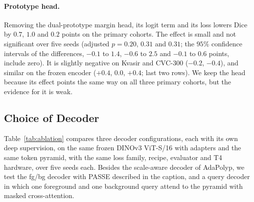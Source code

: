 \documentclass{ieeeaccess}
\begin{document}
\paragraph{Prototype head.} Removing the dual-prototype margin head, its logit term and its loss lowers Dice by $0.7$, $1.0$ and $0.2$ points on the primary cohorts. The effect is small and not significant over five seeds (adjusted $p=0.20$, $0.31$ and $0.31$; the $95\%$ confidence intervals of the differences, $-0.1$ to $1.4$, $-0.6$ to $2.5$ and $-0.1$ to $0.6$ points, include zero). It is slightly negative on Kvasir and CVC-300 ($-0.2$, $-0.4$), and similar on the frozen encoder ($+0.4$, $0.0$, $+0.4$; last two rows). We keep the head because its effect points the same way on all three primary cohorts, but the evidence for it is weak.

\subsection{Choice of Decoder}
\label{sec:ablation}
Table~\ref{tab:ablation} compares three decoder configurations, each with its own deep supervision, on the same frozen DINOv3 ViT-S/16 with adapters and the same token pyramid, with the same loss family, recipe, evaluator and T4 hardware, over five seeds each. Besides the scale-aware decoder of AdaPolyp, we test the fg/bg decoder with PASSE described in the caption, and a query decoder in which one foreground and one background query attend to the pyramid with masked cross-attention.

\begin{table}[!t]
  \centering
  \caption{\textbf{Decoder comparison on the same frozen encoder and token pyramid.} Dice (\%) at threshold $0.5$, mean $\pm$ SD over $5$ seeds; all models use the frozen DINOv3 ViT-S/16 with convolutional adapters, the recipe of Section~\ref{sec:training} and T4 hardware. fg/bg decoder: four top-down stages predicting foreground and background logits gated by boundary uncertainty, with a $768$-channel fusion head; PASSE: prototype-anchored spatial support envelope on the output logits. Params in millions; GMACs per frame; latency in ms at batch $1$, FP16 CUDA graph on an NVIDIA T4. \textbf{Bold}: best in column.}
  \label{tab:ablation}
  \vspace{2pt}
  \setlength{\tabcolsep}{4pt}
\end{table}
\end{document}
